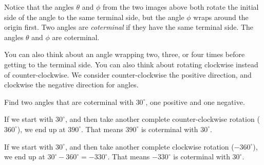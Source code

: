 \documentclass[nooutcomes]{ximera}
\begin{document}
	\begin{image}
	\end{image}

Notice that the angles $\theta$ and $\phi$ from the two images above both rotate the initial side of the angle to the same terminal side, but the angle $\phi$ wraps around the origin first. Two angles are \emph{coterminal} if they have the same terminal side.
The angles $\theta$ and $\phi$ are coterminal. 

You can also think about an angle wrapping two, three, or four times before 
getting to the terminal side. You can also think about rotating clockwise instead of counter-clockwise. We consider counter-clockwise the positive direction, and clockwise the negative direction for angles. 

\begin{example}
	Find two angles that are coterminal with $30^\circ$, one positive and one negative.

	\begin{explanation}

		If we start with $30^\circ$, and then take another complete counter-clockwise rotation ($360^\circ$), we end up at $390^\circ$. That means $390^\circ$ is coterminal with $30^\circ$.

		If we start with $30^\circ$, and then take another complete clockwise rotation ($-360^\circ$), we end up at $30^\circ-360^\circ = -330^\circ$. That means $-330^\circ$ is coterminal with $30^\circ$.
	\end{explanation}
\end{example}
\end{document}
